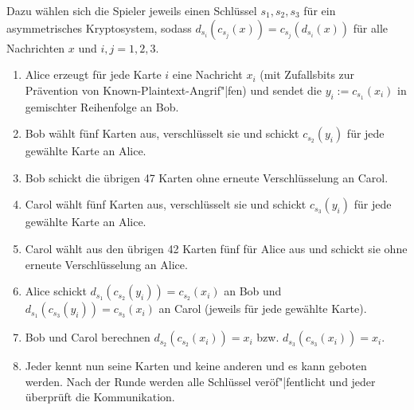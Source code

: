 Dazu wählen sich die Spieler jeweils einen Schlüssel $s_1, s_2, s_3$
für ein asymmetrisches Kryptosystem, sodass $d_{s_i}(c_{s_j}(x)) = c_{s_j}(d_{s_i}(x))$
für alle Nachrichten $x$ und $i, j = 1, 2, 3$.
\begin{enumerate}
    \item
    Alice erzeugt für jede Karte $i$ eine Nachricht $x_i$
    (mit Zufallsbits zur Prävention von Known-Plaintext-Angrif"|fen)
    und sendet die $y_i := c_{s_1}(x_i)$ in gemischter Reihenfolge an Bob.

    \item
    Bob wählt fünf Karten aus, verschlüsselt sie und schickt $c_{s_2}(y_i)$ für jede
    gewählte Karte an Alice.

    \item
    Bob schickt die übrigen 47 Karten ohne erneute Verschlüsselung an Carol.

    \item
    Carol wählt fünf Karten aus, verschlüsselt sie und schickt $c_{s_3}(y_i)$ für jede
    gewählte Karte an Alice.

    \item
    Carol wählt aus den übrigen 42 Karten fünf für Alice aus
    und schickt sie ohne erneute Verschlüsselung an Alice.

    \item
    Alice schickt $d_{s_1}(c_{s_2}(y_i)) = c_{s_2}(x_i)$ an Bob und
    $d_{s_1}(c_{s_3}(y_i)) = c_{s_3}(x_i)$ an Carol (jeweils für jede gewählte Karte).

    \item
    Bob und Carol berechnen $d_{s_2}(c_{s_2}(x_i)) = x_i$ bzw. $d_{s_3}(c_{s_3}(x_i)) = x_i$.

    \item
    Jeder kennt nun seine Karten und keine anderen und es kann geboten werden.
    Nach der Runde werden alle Schlüssel veröf"|fentlicht und jeder überprüft die Kommunikation.
\end{enumerate}

\pagebreak
